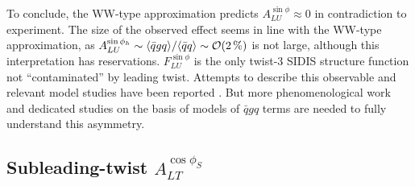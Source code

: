 \documentclass[a4paper,11pt]{article}
\newcommand{\la}{\langle}
\newcommand{\ra}{\rangle}
\begin{document}
To conclude, the WW-type approximation predicts $A_{LU}^{\sin\phi}\approx 0$
in contradiction to experiment. The size of the observed effect seems
in line with the WW-type approximation, as
$A_{LU}^{\sin\phi_h}\sim\la\bar{q}gq\ra/\la\bar{q}q\ra \sim {\cal O}(2\,\%)$
is not large, although this interpretation has reservations.
$F_{LU}^{\sin\phi}$ is the only twist-3 SIDIS structure function not
``contaminated'' by leading twist. Attempts to describe this observable
and relevant model studies have been reported
\cite{Efremov:2002qh,Schweitzer:2003uy,Ohnishi:2003mf,Cebulla:2007ej,
Efremov:2002ut,Afanasev:2003ze,Yuan:2003gu,Gamberg:2003pz,Metz:2004je,Afanasev:2006gw,Mao:2012dk,Mao:2013waa,Mao:2014dva,Lorce:2014hxa,Courtoy:2014ixa,Yang:2016mxl}.
But more phenomenological work and dedicated studies on the basis of models
of $\bar{q}gq$ terms are needed to fully understand this asymmetry.


\subsection{\boldmath Subleading-twist  $A_{LT}^{\cos\phi_S}$}
\label{Sec-7.2:FLTcosphiS}
\end{document}
